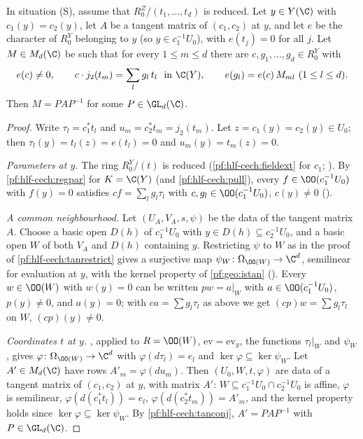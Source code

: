 \begin{theorem}\label{pf:hlf-cech:locpar}
In situation (S), assume that $R^Z_0/(t_1,\dots,t_d)$ is reduced. Let $y\in Y(\C)$ with $c_1(y)=c_2(y)$, let $A$ be a tangent matrix of $(c_1,c_2)$ at $y$,
and let $e$ be the character of $R^Y_0$ belonging to $y$ (so $y\in c_1^{-1}U_0$), with $e(t_j)=0$ for all $j$. Let $M\in M_d(\C)$ be such that for every
$1\le m\le d$ there are $c,g_1,\dots,g_d\in R^Y_0$ with
\[
  e(c)\ne0,\qquad c\cdot j_2(t_m)=\sum_lg_l\,t_l\ \text{ in }\C(Y),\qquad e(g_l)=e(c)\,M_{ml}\ (1\le l\le d).
\]
Then $M=PAP^{-1}$ for some $P\in\GL_d(\C)$.
\end{theorem}

\begin{proof}
Write $\tau_l=c_1^*t_l$ and $u_m=c_2^*t_m=j_2(t_m)$. Let $z=c_1(y)=c_2(y)\in U_0$; then $\tau_l(y)=t_l(z)=e(t_l)=0$ and $u_m(y)=t_m(z)=0$.

\emph{Parameters at $y$.} The ring $R^Y_0/(t)$ is reduced (\cref{pf:hlf-cech:fieldext} for $c_1$;
). By \cref{pf:hlf-cech:regpar} for $K=\C(Y)$ (and \cref{pf:hlf-cech:pull}), every
$f\in\OO(c_1^{-1}U_0)$ with $f(y)=0$ satisfies $cf=\sum_lg_l\tau_l$ with $c,g_l\in\OO(c_1^{-1}U_0)$, $c(y)\ne0$
().

\emph{A common neighbourhood.} Let $(U_A,V_A,s,\psi)$ be the data of the tangent matrix $A$. Choose a basic open $D(h)$ of $c_1^{-1}U_0$ with
$y\in D(h)\subseteq c_2^{-1}U_0$, and a basic open $W$ of both $V_A$ and $D(h)$ containing $y$. Restricting $\psi$ to $W$ as in the proof of
\cref{pf:hlf-cech:tanrestrict} gives a surjective map $\psi_W\colon\Omega_{\OO(W)}\to\C^d$, semilinear for evaluation at $y$, with the kernel property
of \cref{pf:geo:istan} (). Every $w\in\OO(W)$ with $w(y)=0$ can be written $pw=a|_W$ with
$a\in\OO(c_1^{-1}U_0)$, $p(y)\ne0$, and $a(y)=0$; with $ca=\sum g_l\tau_l$ as above we get $(cp)w=\sum g_l\tau_l$ on $W$, $(cp)(y)\ne0$.

\emph{Coordinates $t$ at $y$.} , applied to $R=\OO(W)$, $\mathrm{ev}=\mathrm{ev}_y$, the functions $\tau_l|_W$ and $\psi_W$, gives
$\varphi\colon\Omega_{\OO(W)}\to\C^d$ with $\varphi(d\tau_l)=e_l$ and $\ker\varphi\subseteq\ker\psi_W$. Let $A'\in M_d(\C)$ have rows $A'_m=\varphi(du_m)$. Then
$(U_0,W,t,\varphi)$ are data of a tangent matrix of $(c_1,c_2)$ at $y$, with matrix $A'$: $W\subseteq c_1^{-1}U_0\cap c_2^{-1}U_0$ is affine, $\varphi$ is
semilinear, $\varphi(d(c_1^*t_l))=e_l$, $\varphi(d(c_2^*t_m))=A'_m$, and the kernel property holds since $\ker\varphi\subseteq\ker\psi_W$. By
\cref{pf:hlf-cech:tanconj}, $A'=PAP^{-1}$ with $P\in\GL_d(\C)$.


\end{proof}
